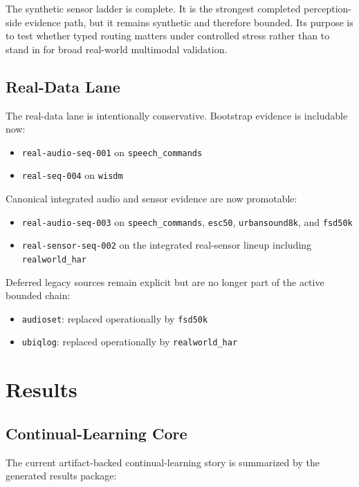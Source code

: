 \documentclass{article}
\begin{document}
The synthetic sensor ladder is complete. It is the strongest completed perception-side evidence path, but it remains synthetic and therefore bounded. Its purpose is to test whether typed routing matters under controlled stress rather than to stand in for broad real-world multimodal validation.

\subsection{Real-Data Lane}

The real-data lane is intentionally conservative. Bootstrap evidence is includable now:
\begin{itemize}[leftmargin=*]
  \item \texttt{real-audio-seq-001} on \texttt{speech\_commands}
  \item \texttt{real-seq-004} on \texttt{wisdm}
\end{itemize}
Canonical integrated audio and sensor evidence are now promotable:
\begin{itemize}[leftmargin=*]
  \item \texttt{real-audio-seq-003} on \texttt{speech\_commands}, \texttt{esc50}, \texttt{urbansound8k}, and \texttt{fsd50k}
  \item \texttt{real-sensor-seq-002} on the integrated real-sensor lineup including \texttt{realworld\_har}
\end{itemize}
Deferred legacy sources remain explicit but are no longer part of the active bounded chain:
\begin{itemize}[leftmargin=*]
  \item \texttt{audioset}: replaced operationally by \texttt{fsd50k}
  \item \texttt{ubiqlog}: replaced operationally by \texttt{realworld\_har}
\end{itemize}

\section{Results}

\subsection{Continual-Learning Core}

The current artifact-backed continual-learning story is summarized by the generated results package:

\end{document}
